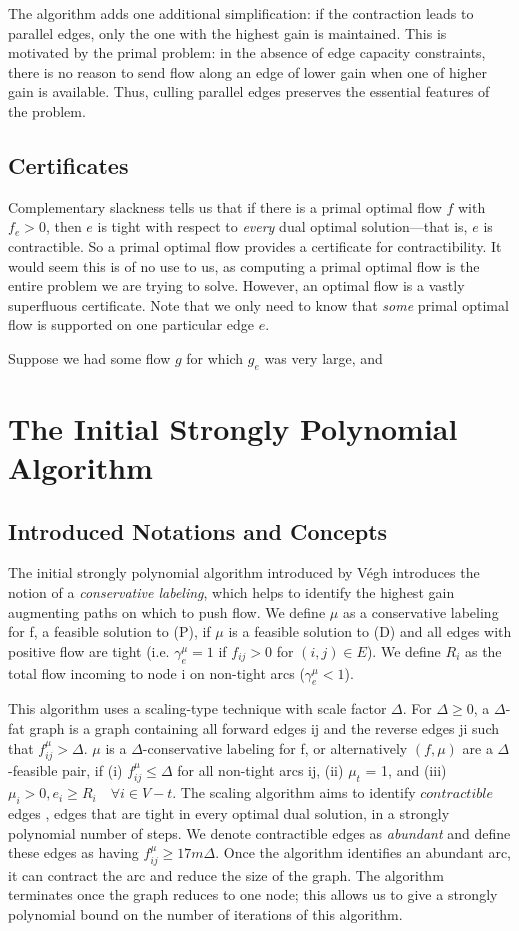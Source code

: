 \documentclass[11pt]{article}
\theoremstyle{definition}
\theoremstyle{definition}
\newcommand{\geu}{\gamma_e^{\mu}}
\begin{document}
	The algorithm adds one additional simplification: if the contraction leads to parallel edges,
	only the one with the highest gain is maintained. This is motivated by the primal problem: in
	the absence of edge capacity constraints, there is no reason to send flow along an edge of
	lower gain when one of higher gain is available. Thus, culling parallel edges preserves the
	essential features of the problem.
	
	\subsection{Certificates}
	Complementary slackness tells us that if there is a primal optimal flow $f$ with
	$f_e > 0$, then $e$ is tight with respect to \emph{every} dual optimal solution---that
	is, $e$ is contractible. So a primal optimal flow provides a certificate for contractibility.
	It would seem this is of no use to us, as computing a primal optimal flow is the entire
	problem we are trying to solve. However, an optimal flow is a vastly superfluous certificate.
	Note that we only need to know that \emph{some}
	primal optimal flow is supported on one particular edge $e$.
	
	Suppose we had some flow $g$ for which $g_e$ was very large, and 
	

\section{The Initial Strongly Polynomial Algorithm}
\subsection{Introduced Notations and Concepts}
The initial strongly polynomial algorithm introduced by Végh \cite{Vegh2013} introduces the notion of a \textit{conservative labeling}, which helps to identify the highest gain augmenting paths on which to push flow. We define $\mu$ as a conservative labeling for f, a feasible solution to (P), if $\mu$ is a feasible solution to (D) and all edges with positive flow are tight (i.e. $\geu = 1$ if $f_{ij} > 0$ for $(i, j) \in E$). We define $R_i$ as the total flow incoming to node i on non-tight arcs ($\geu < 1$).

This algorithm uses a scaling-type technique with scale factor $\Delta$. For $\Delta \geq 0$, a $\Delta$-fat graph is a graph containing all forward edges ij and the reverse edges ji such that $f_{ij}^\mu > \Delta$. $\mu$ is a $\Delta$-conservative labeling for f, or alternatively $(f, \mu)$ are a $\Delta$-feasible pair, if (i) $f_{ij}^\mu \leq \Delta$ for all non-tight arcs ij, (ii) $\mu_t$ = 1, and (iii) $\mu_i > 0, e_i \geq R_i \quad \forall i \in V -t$. The scaling algorithm aims to identify $\textit{contractible}$ edges \cite{Orlin1988}, edges that are tight in every optimal dual solution, in a strongly polynomial number of steps. We denote contractible edges as \emph{abundant} and define these edges as having $f_{ij}^\mu \geq 17m\Delta$. Once the algorithm identifies an abundant arc, it can contract the arc and reduce the size of the graph. The algorithm terminates once the graph reduces to one node; this allows us to give a strongly polynomial bound on the number of iterations of this algorithm.
\end{document}
